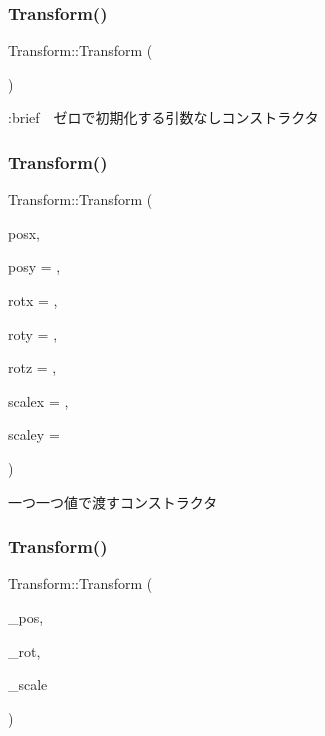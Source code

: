 \subsubsection{\texorpdfstring{Transform()}{Transform()}\hspace{0.1cm}{\footnotesize\ttfamily [1/4]}}
{\footnotesize\ttfamily Transform\+::\+Transform (\begin{DoxyParamCaption}{ }\end{DoxyParamCaption})}

\+:brief　ゼロで初期化する引数なしコンストラクタ \mbox{\label{class_transform_a14fa5149a8efcc92e3d53d177b6daace}} 
\subsubsection{\texorpdfstring{Transform()}{Transform()}\hspace{0.1cm}{\footnotesize\ttfamily [2/4]}}
{\footnotesize\ttfamily Transform\+::\+Transform (\begin{DoxyParamCaption}\item[{const float}]{posx,  }\item[{const float}]{posy = {},  }\item[{const float}]{rotx = {},  }\item[{const float}]{roty = {},  }\item[{const float}]{rotz = {},  }\item[{const float}]{scalex = {},  }\item[{const float}]{scaley = {} }\end{DoxyParamCaption})}



一つ一つ値で渡すコンストラクタ 

\mbox{\label{class_transform_a06ab752a6562e1d0de11357525bd55a3}} 
\subsubsection{\texorpdfstring{Transform()}{Transform()}\hspace{0.1cm}{\footnotesize\ttfamily [3/4]}}
{\footnotesize\ttfamily Transform\+::\+Transform (\begin{DoxyParamCaption}\item[{const \mbox{\hyperlink{transform_8h_afb0c5e21d4133ff4f200992c0b534e1b}{V\+E\+C2}} \&}]{\+\_\+pos,  }\item[{const \mbox{\hyperlink{transform_8h_a7e10f09694869ec22cb183f13a59289c}{V\+E\+C3}} \&}]{\+\_\+rot,  }\item[{const \mbox{\hyperlink{transform_8h_afb0c5e21d4133ff4f200992c0b534e1b}{V\+E\+C2}} \&}]{\+\_\+scale }\end{DoxyParamCaption})}



